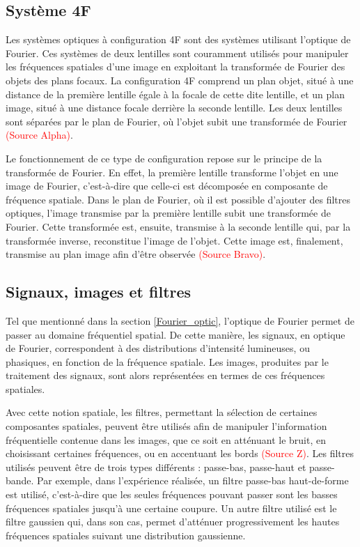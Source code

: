 \documentclass[11pt,letterpaper]{article}
\begin{document}
\subsection{Système 4F}
Les systèmes optiques à configuration 4F sont des systèmes utilisant l'optique de Fourier. Ces systèmes de deux lentilles sont couramment utilisés pour manipuler les fréquences spatiales d'une image en exploitant la transformée de Fourier des objets des plans focaux. La configuration 4F comprend un plan objet, situé à une distance de la première lentille égale à la focale de cette dite lentille, et un plan image, situé à une distance focale derrière la seconde lentille. Les deux lentilles sont séparées par le plan de Fourier, où l'objet subit une transformée de Fourier \textcolor{red}{(Source Alpha)}.

Le fonctionnement de ce type de configuration repose sur le principe de la transformée de Fourier. En effet, la première lentille transforme l'objet en une image de Fourier, c'est-à-dire que celle-ci est décomposée en composante de fréquence spatiale. Dans le plan de Fourier, où il est possible d'ajouter des filtres optiques, l'image transmise par la première lentille subit une transformée de Fourier. Cette transformée est, ensuite, transmise à la seconde lentille qui, par la transformée inverse, reconstitue l'image de l'objet. Cette image est, finalement, transmise au plan image afin d'être observée \textcolor{red}{(Source Bravo)}.



\subsection{Signaux, images et filtres}
Tel que mentionné dans la section \ref{Fourier_optic}, l'optique de Fourier permet de passer au domaine fréquentiel spatial. De cette manière, les signaux, en optique de Fourier, correspondent à des distributions d'intensité lumineuses, ou phasiques, en fonction de la fréquence spatiale. Les images, produites par le traitement des signaux, sont alors représentées en termes de ces fréquences spatiales.

Avec cette notion spatiale, les filtres, permettant la sélection de certaines composantes spatiales, peuvent être utilisés afin de manipuler l'information fréquentielle contenue dans les images, que ce soit en atténuant le bruit, en choisissant certaines fréquences, ou en accentuant les bords \textcolor{red}{(Source Z)}. Les filtres utilisés peuvent être de trois types différents : passe-bas, passe-haut et passe-bande. Par exemple, dans l'expérience réalisée, un filtre passe-bas haut-de-forme est utilisé, c'est-à-dire que les seules fréquences pouvant passer sont les basses fréquences spatiales jusqu'à une certaine coupure. Un autre filtre utilisé est le filtre gaussien qui, dans son cas, permet d'atténuer progressivement les hautes fréquences spatiales suivant une distribution gaussienne.
\end{document}
